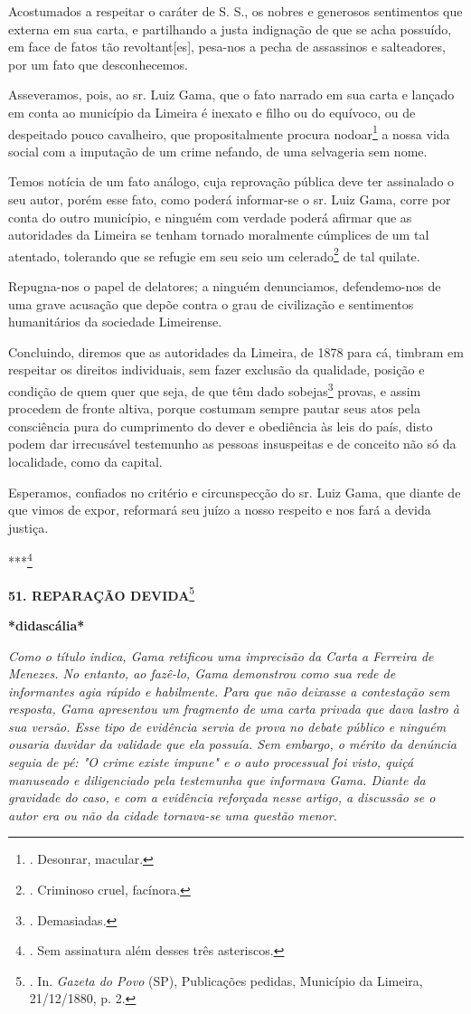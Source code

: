 Acostumados a respeitar o caráter de S. S., os nobres e generosos
sentimentos que externa em sua carta, e partilhando a justa indignação
de que se acha possuído, em face de fatos tão revoltant{[}es{]},
pesa-nos a pecha de assassinos e salteadores, por um fato que
desconhecemos.

Asseveramos, pois, ao sr. Luiz Gama, que o fato narrado em sua carta e
lançado em conta ao município da Limeira é inexato e filho ou do
equívoco, ou de despeitado pouco cavalheiro, que propositalmente procura
nodoar\footnote{. Desonrar, macular.} a nossa vida social com a
imputação de um crime nefando, de uma selvageria sem nome.

Temos notícia de um fato análogo, cuja reprovação pública deve ter
assinalado o seu autor, porém esse fato, como poderá informar-se o sr.
Luiz Gama, corre por conta do outro município, e ninguém com verdade
poderá afirmar que as autoridades da Limeira se tenham tornado
moralmente cúmplices de um tal atentado, tolerando que se refugie em seu
seio um celerado\footnote{. Criminoso cruel, facínora.} de tal quilate.

Repugna-nos o papel de delatores; a ninguém denunciamos, defendemo-nos
de uma grave acusação que depõe contra o grau de civilização e
sentimentos humanitários da sociedade Limeirense.

Concluindo, diremos que as autoridades da Limeira, de 1878 para cá,
timbram em respeitar os direitos individuais, sem fazer exclusão da
qualidade, posição e condição de quem quer que seja, de que têm dado
sobejas\footnote{. Demasiadas.} provas, e assim procedem de fronte
altiva, porque costumam sempre pautar seus atos pela consciência pura do
cumprimento do dever e obediência às leis do país, disto podem dar
irrecusável testemunho as pessoas insuspeitas e de conceito não só da
localidade, como da capital.

Esperamos, confiados no critério e circunspecção do sr. Luiz Gama, que
diante de que vimos de expor, reformará seu juízo a nosso respeito e nos
fará a devida justiça.

***\footnote{. Sem assinatura além desses três asteriscos.}

\textbf{51. REPARAÇÃO DEVIDA}\footnote{. In. \emph{Gazeta do Povo} (SP),
  Publicações pedidas, Município da Limeira, 21/12/1880, p. 2.}

\textbf{*didascália*}

\emph{Como o título indica, Gama retificou uma imprecisão da Carta a
Ferreira de Menezes. No entanto, ao fazê-lo, Gama demonstrou como sua
rede de informantes agia rápido e habilmente. Para que não deixasse a
contestação sem resposta, Gama apresentou um fragmento de uma carta
privada que dava lastro à sua versão. Esse tipo de evidência servia de
prova no debate público e ninguém ousaria duvidar da validade que ela
possuía. Sem embargo, o mérito da denúncia seguia de pé: "O crime existe
impune" e o auto processual foi visto, quiçá manuseado e diligenciado
pela testemunha que informava Gama. Diante da gravidade do caso, e com a
evidência reforçada nesse artigo, a discussão se o autor era ou não da
cidade tornava-se uma questão menor. }

